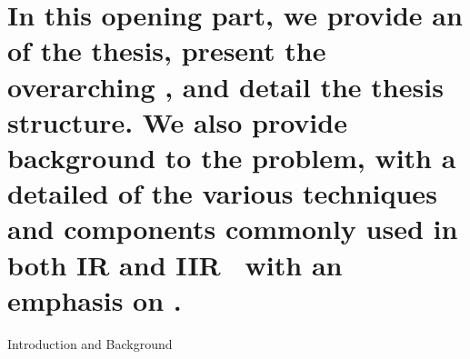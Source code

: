 
\part[Introduction and Background]{In this opening part, we provide an  of the thesis, present the overarching , and detail the thesis structure. We also provide background to the problem, with a detailed  of the various techniques and components commonly used in both IR and IIR \textemdash~with an emphasis on .}{Introduction and Background}
\label{part:intro}
